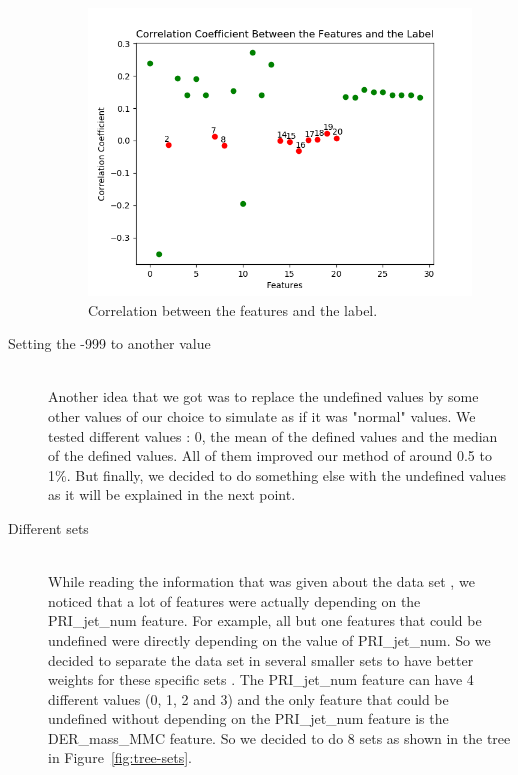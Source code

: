 \documentclass[10pt,conference,compsocconf]{IEEEtran}
\begin{document}
\begin{description}
\begin{figure}[hbtp]
  \centering
  \includegraphics[width=\columnwidth]{images/corrcoefs.png}
  \caption{Correlation between the features and the label.}
  \vspace{-3mm}
  \label{fig:corr-coefs}
\end{figure}

\item[Setting the -999 to another value] \ \\
Another idea that we got was to replace the undefined values by some other values of our choice to simulate as if it was "normal" values. We tested different values : 0, the mean of the defined values and the median of the defined values. All of them improved our method of around 0.5 to 1\%. But finally, we decided to do something else with the undefined values as it will be explained in the next point.

\item[Different sets] \ \\
While reading the information that was given about the data set  \cite{higgsChallenge14}, we noticed that a lot of features were actually depending on the PRI\_jet\_num feature. For example, all but one features that could be undefined were directly depending on the value of PRI\_jet\_num. So we decided to separate the data set in several smaller sets to have better weights for these specific sets \cite{brown14}. The PRI\_jet\_num feature can have 4 different values (0, 1, 2 and 3) and the only feature that could be undefined without depending on the PRI\_jet\_num feature is the DER\_mass\_MMC feature. So we decided to do 8 sets as shown in the tree in Figure~\ref{fig:tree-sets}. 


\end{description}
\end{document}
